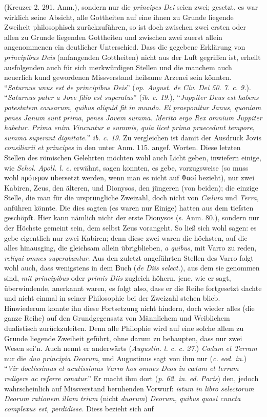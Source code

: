 \documentclass[a4paper, 11pt, oneside]{article}
\begin{document}
(Kreuzer 2. 291. Anm.), sondern nur die \emph{principes Dei} seien zwei; gesetzt, es war wirklich seine Absicht, alle Gottheiten auf eine ihnen zu Grunde liegende Zweiheit philosophisch zurückzuführen, so ist doch zwischen zwei ersten oder allen zu Grunde liegenden Gottheiten und zwischen zwei zuerst allein angenommenen ein deutlicher Unterschied. Dass die gegebene Erklärung von \emph{principibus Deis} (anfangenden Gottheiten) nicht aus der Luft gegriffen ist, erhellt ausfolgenden auch für sich merkwürdigen Stellen und die manchem auch neuerlich kund gewordenen Missverstand heilsame Arzenei sein könnten. "`\emph{Saturnus unus est de principibus Deis}"' (\emph{op. August. de Civ. Dei 50. 7. c. 9.}). "`\emph{Saturnus pater a Jove filio est superatus}"' (\emph{ib. c. 19.}), "`\emph{Juppiter Deus est habens potestatem causarum, quibus aliquid fit in mundo. Ei praeponitur Janus, quoniam penes Janum sunt prima, penes Jovem summa. Merito ergo Rex omnium Juppiter habetur. Prima enim Vincuntur a summis, quia licet prima praecedunt tempore, summa superant dignitate.}"' \emph{ib. c. 19.} Zu vergleichen ist damit der Ausdruck Jovis \emph{consiliarii et principes} in den unter Anm. 115. angef. Worten. Diese letzten Stellen des römischen Gelehrten möchten wohl auch Licht geben, inwiefern einige, wie \emph{Schol. Apoll. l. c.} erwähnt, sagen konnten, es gebe, vorzugsweise (so muss wohl πρότερον übersetzt werden, wenn man es nicht auf Φασί bezieht), nur zwei Kabiren, Zeus, den älteren, und Dionysos, den jüngeren (von beiden); die einzige Stelle, die man für die ursprüngliche Zweizahl, doch nicht von \emph{Cœlum} und \emph{Terra}, anführen könnte. Die dies sagten (es waren nur Einige) hatten aus dem tiefsten geschöpft. Hier kann nämlich nicht der erste Dionysos (s. Anm. 80.), sondern nur der Höchste gemeint sein, dem selbst Zeus vorangeht. So ließ sich wohl sagen: es gebe eigentlich nur zwei Kabiren; denn diese zwei waren die höchsten, auf die alles hinausging, die gleichsam allein übrigblieben, \emph{a quibus}, mit Varro zu reden, \emph{reliqui omnes superabantur}. Aus den zuletzt angeführten Stellen des Varro folgt wohl auch, dass wenigstens in dem Buch (\emph{de Diis select.}), aus dem sie genommen sind, \emph{mit principibus} oder \emph{primis Diis} zugleich höhern, jene, wie er sagt, überwindende, anerkannt waren, es folgt also, dass er die Reihe fortgesetzt dachte und nicht einmal in seiner Philosophie bei der Zweizahl stehen blieb. Hinwiederum konnte ihn diese Fortsetzung nicht hindern, doch wieder alles (die ganze Reihe) auf den Grundgegensatz von Männlichem und Weiblichem dualistisch zurückzuleiten. Denn alle Philophie wird auf eine solche allem zu Grunde liegende Zweiheit geführt, ohne darum zu behaupten, dass nur zwei Wesen sei'n. Auch nennt er anderwärts (\emph{Augustin. l. c. c. 27.}) \emph{Cœlum et Terram} nur die \emph{duo principia Deorum}, und Augustinus sagt von ihm nur (\emph{c. eod. in.}) "`\emph{Vir doctissimus et acutissimus Varro hos omnes Deos in cœlum et terram redigere ac referre conatur}."' Er macht ihm dort (\emph{p. 62. in. ed. Paris}) den, jedoch wahrscheinlich auf Missverstand beruhenden Vorwurf: \emph{istum in libro selectorum Deorum rationem illam trium} (nicht \emph{duorum}) \emph{Deorum, quibus quasi cuncta complexus est, perdidisse.} Diess bezieht sich auf 
\end{document}
